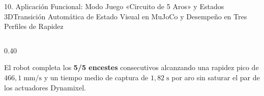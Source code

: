 \documentclass[aspectratio=169,10pt,xcolor=table]{beamer}
\begin{document}
\begin{frame}{10. Aplicación Funcional: Modo Juego «Circuito de 5 Aros» y Estados 3D}{Transición Automática de Estado Visual en MuJoCo y Desempeño en Tres Perfiles de Rapidez}
\begin{columns}[T,totalwidth=\textwidth]
  \begin{column}{0.40\textwidth}
    \begin{cajaadv}
      \fontsize{6.2}{7.5}\selectfont
      El robot completa los \textbf{5/5 encestes} consecutivos alcanzando una rapidez pico de \textbf{$466{,}1\;\text{mm/s}$} y un tiempo medio de captura de \textbf{$1{,}82\;\text{s}$} por aro sin saturar el par de los actuadores Dynamixel.
    \end{cajaadv}
  \end{column}
\end{columns}
\end{frame}

\end{document}
